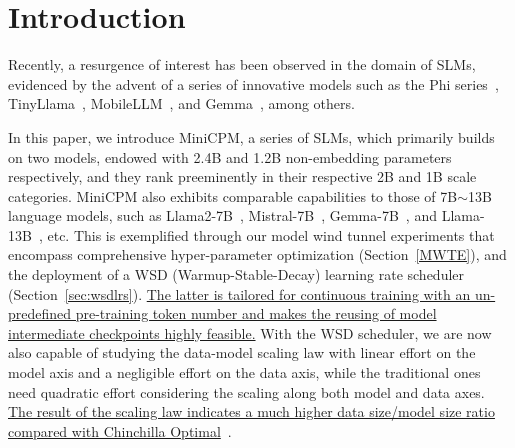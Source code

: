 \section{Introduction}

Recently, a resurgence of interest has been observed in the domain of SLMs, evidenced by the advent of a series of innovative models such as the Phi series~\citep{gunasekar2023textbooks, li2023textbooks, Javaheripi2023Phi2}, TinyLlama~\citep{zhang2024tinyllama}, MobileLLM~\citep{liu2024mobilellm}, and Gemma~\citep{Banks2024Gemma}, among others.

In this paper, we introduce MiniCPM, a series of SLMs, which primarily builds on two models, endowed with 2.4B and 1.2B non-embedding parameters respectively, and they rank preeminently in their respective 2B and 1B scale categories. MiniCPM also exhibits comparable capabilities to those of 7B$\sim$13B language models, such as Llama2-7B~\citep{touvron2023llama}, Mistral-7B~\citep{jiang2023mistral}, Gemma-7B~\citep{Banks2024Gemma}, and Llama-13B~\citep{touvron2023llama}, etc. This is exemplified through our model wind tunnel experiments that encompass comprehensive hyper-parameter optimization (Section~\ref{MWTE}), and the deployment of a WSD (Warmup-Stable-Decay) learning rate scheduler (Section~\ref{sec:wsdlrs}). \uline{The latter is tailored for continuous training with an un-predefined pre-training token number and makes the reusing of model intermediate checkpoints highly feasible.} With the WSD scheduler, we are now also capable of studying the data-model scaling law with linear effort on the model axis and a negligible effort on the data axis, while the traditional ones need quadratic effort considering the scaling along both model and data axes. \uline{The result of the scaling law indicates a much higher data size/model size ratio compared with Chinchilla Optimal}~\citep{hoffmann2022training}.